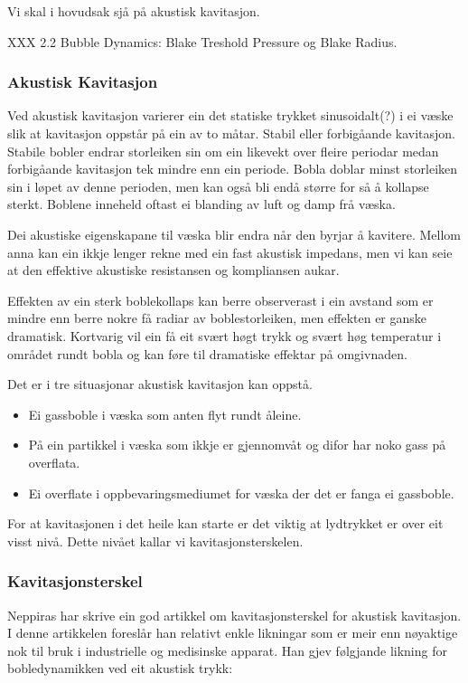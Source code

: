 Vi skal i hovudsak sjå på akustisk kavitasjon.

XXX 2.2 Bubble Dynamics:
Blake Treshold Pressure og Blake Radius.



\subsubsection{Akustisk Kavitasjon}
Ved akustisk kavitasjon varierer ein det statiske trykket sinusoidalt(?) i ei væske slik at kavitasjon oppstår på ein av to måtar. Stabil eller forbigåande kavitasjon. Stabile bobler endrar storleiken sin om ein likevekt over fleire periodar medan forbigåande kavitasjon tek mindre enn ein periode. Bobla doblar minst storleiken sin i løpet av denne perioden, men kan også bli endå større for så å kollapse sterkt. Boblene inneheld oftast ei blanding av luft og damp frå væska.

Dei akustiske eigenskapane til væska blir endra når den byrjar å kavitere. Mellom anna kan ein ikkje lenger rekne med ein fast akustisk impedans, men vi kan seie at den effektive akustiske resistansen og kompliansen aukar.

Effekten av ein sterk boblekollaps kan berre observerast i ein avstand som er mindre enn berre nokre få radiar av boblestorleiken, men effekten er ganske dramatisk. Kortvarig vil ein få eit svært høgt trykk og svært høg temperatur i området rundt bobla og kan føre til dramatiske effektar på omgivnaden.

Det er i tre situasjonar akustisk kavitasjon kan oppstå.
\begin{itemize}
\item Ei gassboble i væska som anten flyt rundt åleine.
\item På ein partikkel i væska som ikkje er gjennomvåt og difor har noko gass på overflata.
\item Ei overflate i oppbevaringsmediumet for væska der det er fanga ei gassboble. 
\end{itemize}

For at kavitasjonen i det heile kan starte er det viktig at lydtrykket er over eit visst nivå. Dette nivået kallar vi kavitasjonsterskelen.

\subsubsection{Kavitasjonsterskel}

Neppiras \cite{NeppirasThreshold} har skrive ein god artikkel om kavitasjonsterskel for akustisk kavitasjon. I denne artikkelen foreslår han relativt enkle likningar som er meir enn nøyaktige nok til bruk i industrielle og medisinske apparat. Han gjev følgjande likning for bobledynamikken ved eit akustisk trykk:

